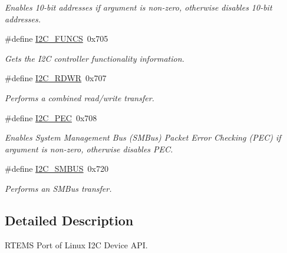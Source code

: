 \begin{Indent}
\begin{DoxyCompactItemize}
\begin{DoxyCompactList}\small\item\em Enables 10-\/bit addresses if argument is non-\/zero, otherwise disables 10-\/bit addresses. \end{DoxyCompactList}\item 
\#define \mbox{\hyperlink{group__I2CLinux_ga4c2f02700f22d4f76c670966aed5079a}{I2\+C\+\_\+\+F\+U\+N\+CS}}~0x705
\begin{DoxyCompactList}\small\item\em Gets the I2C controller functionality information. \end{DoxyCompactList}\item 
\#define \mbox{\hyperlink{group__I2CLinux_ga7645f9831bcbbae2339fcff4d85691be}{I2\+C\+\_\+\+R\+D\+WR}}~0x707
\begin{DoxyCompactList}\small\item\em Performs a combined read/write transfer. \end{DoxyCompactList}\item 
\#define \mbox{\hyperlink{group__I2CLinux_ga2a72d7072db21c407f82e6e73854b38f}{I2\+C\+\_\+\+P\+EC}}~0x708
\begin{DoxyCompactList}\small\item\em Enables System Management Bus (S\+M\+Bus) Packet Error Checking (P\+EC) if argument is non-\/zero, otherwise disables P\+EC. \end{DoxyCompactList}\item 
\#define \mbox{\hyperlink{group__I2CLinux_ga4e9d483fb9eb1074646726ce518b1d4d}{I2\+C\+\_\+\+S\+M\+B\+US}}~0x720
\begin{DoxyCompactList}\small\item\em Performs an S\+M\+Bus transfer. \end{DoxyCompactList}\end{DoxyCompactItemize}
\end{Indent}


\subsection{Detailed Description}
R\+T\+E\+MS Port of Linux I2C Device A\+PI. 


